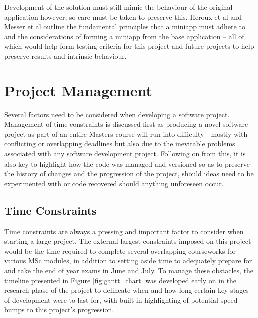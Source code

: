 \documentclass[conference]{IEEEtran}
\begin{document}
Development of the solution must still mimic the behaviour of the original application however, so care must be taken to preserve this. Heroux et al\cite{miniapps} and Messer et al\cite{messer2015developing} outline the fundamental principles that a miniapp must adhere to and the considerations of forming a miniapp from the base application – all of which would help form testing criteria for this project and future projects to help preserve results and intrinsic behaviour.


\section{Project Management}\label{projectmgmt}

Several factors need to be considered when developing a software project. Management of time constraints is discussed first as producing a novel software project as part of an entire Masters course will run into difficulty - mostly with conflicting or overlapping deadlines but also due to the inevitable problems associated with any software development project. Following on from this, it is also key to highlight how the code was managed and versioned so as to preserve the history of changes and the progression of the project, should ideas need to be experimented with or code recovered should anything unforeseen occur.

\subsection{Time Constraints}

Time constraints are always a pressing and important factor to consider when starting a large project. The external largest constraints imposed on this project would be the time required to complete several overlapping courseworks for various MSc modules, in addition to setting aside time to adequately prepare for and take the end of year exams in June and July. To manage these obstacles, the timeline presented in Figure \ref{fig:gantt_chart} was developed early on in the research phase of the project to delineate when and how long certain key stages of development were to last for, with built-in highlighting of potential speed-bumps to this project's progression.
\end{document}
